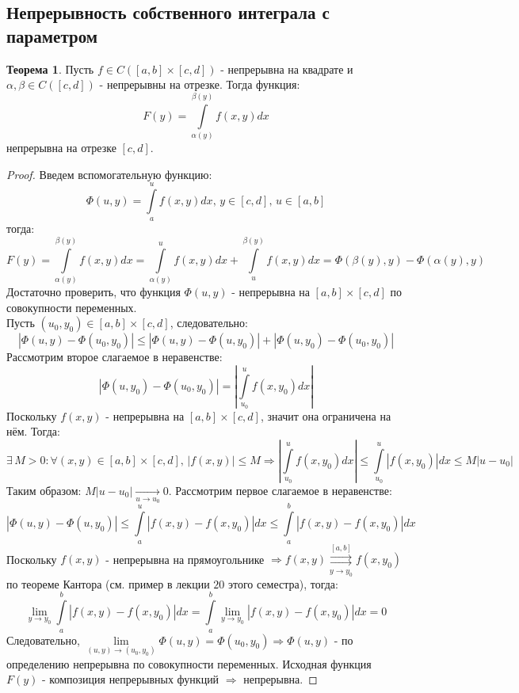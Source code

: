 \documentclass[12pt]{article}
\theoremstyle{definition}
\newtheorem{theorem}{Теорема}
\newcommand{\ddint}[2]{\displaystyle\int\limits_{#1}^{#2}}
\newcommand{\uconvm}[2]{\overset{#1}{\underset{#2}{\rightrightarrows}}}
\begin{document}
\subsection*{Непрерывность собственного интеграла с параметром}
\begin{theorem}
	Пусть $f \in C([a,b]\times[c,d])$ - непрерывна на квадрате и $\alpha,\beta \in C([c,d])$ - непрерывны на отрезке. Тогда  функция: 
	$$
		F(y) = \ddint{\alpha(y)}{\beta(y)}f(x,y)dx
	$$
	непрерывна на отрезке $[c,d]$.
\end{theorem}
\begin{proof}
	Введем вспомогательную функцию:
	$$
		\Phi(u,y) = \ddint{a}{u}f(x,y)dx,\, y \in [c,d], \, u \in [a,b]
	$$
	тогда: 
	$$
		F(y) = \ddint{\alpha(y)}{\beta(y)}f(x,y)dx = \ddint{\alpha(y)}{u}f(x,y)dx + \ddint{u}{\beta(y)}f(x,y)dx  = \Phi(\beta(y), y) - \Phi(\alpha(y),y)
	$$ 
	Достаточно проверить, что функция $\Phi(u,y)$ - непрерывна на $[a,b]\times[c,d]$ по совокупности переменных. \\ Пусть $(u_0, y_0) \in [a,b]\times [c,d]$, следовательно:
	$$
		\left|\Phi(u,y) - \Phi(u_0,y_0)\right| \leq  \left|\Phi(u,y) - \Phi(u,y_0)\right| + \left|\Phi(u,y_0) - \Phi(u_0,y_0)\right|
	$$
	Рассмотрим второе слагаемое в неравенстве:
	$$
		\left|\Phi(u,y_0) - \Phi(u_0,y_0)\right| = \left| \ddint{u_0}{u}f(x,y_0)dx \right|
	$$
	Поскольку $f(x,y)$ - непрерывна на $[a,b]\times [c,d]$, значит она ограничена на нём. Тогда:
	$$
		\exists\, M > 0 \colon \forall (x,y) \in [a,b]\times [c,d], \, |f(x,y)| \leq M \Rightarrow \left| \ddint{u_0}{u}f(x,y_0)dx \right| \leq \ddint{u_0}{u}|f(x,y_0)|dx \leq M|u - u_0|
	$$  
	Таким образом: $M|u - u_0| \xrightarrow[u \to u_0]{}0$. Рассмотрим первое слагаемое в неравенстве:
	$$
		\left|\Phi(u,y) - \Phi(u,y_0)\right| \leq \ddint{a}{u}|f(x,y) - f(x,y_0)|dx \leq \ddint{a}{b}|f(x,y) - f(x,y_0)|dx
	$$
	Поскольку $f(x,y)$ - непрерывна на прямоугольнике $\Rightarrow f(x,y) \uconvm{[a,b]}{y \to y_0} f(x,y_0)$ по теореме Кантора (см. пример в лекции $20$ этого семестра), тогда:
	$$
		\lim\limits_{y \to y_0}\ddint{a}{b}|f(x,y) - f(x,y_0)|dx = \ddint{a}{b}\lim\limits_{y \to y_0} |f(x,y) - f(x,y_0)|dx = 0
	$$
	Следовательно, $\lim\limits_{(u,y) \to (u_0, y_0)}\Phi(u,y) = \Phi(u_0,y_0) \Rightarrow \Phi(u,y)$ - по определению непрерывна по совокупности переменных. Исходная функция $F(y)$ - композиция непрерывных функций $\Rightarrow$ непрерывна.
\end{proof}
\end{document}
